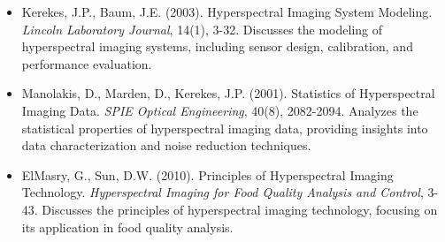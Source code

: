 \documentclass[10pt,svgnames,fragile]{beamer}
\begin{document}
\begin{frame}{}
\tiny
\begin{itemize}

    \item Kerekes, J.P., Baum, J.E. (2003). Hyperspectral Imaging System Modeling. \textit{Lincoln Laboratory Journal}, 14(1), 3-32. \href{https://apps.dtic.mil/sti/citations/ADA415477}{\color{blue}{DOI: 10.1109/TGRS.2003.814658}}
    {\color{gray}Discusses the modeling of hyperspectral imaging systems, including sensor design, calibration, and performance evaluation.}

    \item Manolakis, D., Marden, D., Kerekes, J.P. (2001). Statistics of Hyperspectral Imaging Data. \textit{SPIE Optical Engineering}, 40(8), 2082-2094. \href{https://www.spiedigitallibrary.org/journals/optical-engineering/volume-40/issue-8/2082/Statistics-of-hyperspectral-imaging-data/10.1117/1.1394690.full}{\color{blue}{DOI: 10.1117/1.1394690}}
    {\color{gray}Analyzes the statistical properties of hyperspectral imaging data, providing insights into data characterization and noise reduction techniques.}
    
    \item ElMasry, G., Sun, D.W. (2010). Principles of Hyperspectral Imaging Technology. \textit{Hyperspectral Imaging for Food Quality Analysis and Control}, 3-43. \href{https://www.elsevier.com/books/hyperspectral-imaging-for-food-quality-analysis-and-control/sun/978-0-12-374753-2}{\color{blue}{DOI: 10.1016/B978-0-12-374753-2.00001-8}}
    {\color{gray}Discusses the principles of hyperspectral imaging technology, focusing on its application in food quality analysis.}
\end{itemize}
\end{frame}
\end{document}
